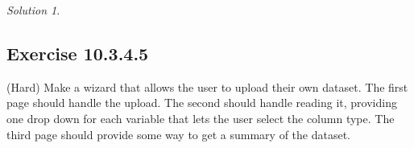 \documentclass[
]{book}
\newenvironment{Shaded}{\begin{snugshade}}{\end{snugshade}}
\newcommand{\AttributeTok}[1]{\textcolor[rgb]{0.77,0.63,0.00}{#1}}
\newcommand{\DecValTok}[1]{\textcolor[rgb]{0.00,0.00,0.81}{#1}}
\newcommand{\FunctionTok}[1]{\textcolor[rgb]{0.00,0.00,0.00}{#1}}
\newcommand{\NormalTok}[1]{#1}
\newcommand{\OtherTok}[1]{\textcolor[rgb]{0.56,0.35,0.01}{#1}}
\newcommand{\SpecialCharTok}[1]{\textcolor[rgb]{0.00,0.00,0.00}{#1}}
\newcommand{\StringTok}[1]{\textcolor[rgb]{0.31,0.60,0.02}{#1}}
\theoremstyle{definition}
\theoremstyle{definition}
\theoremstyle{definition}
\theoremstyle{definition}
\theoremstyle{remark}
\newtheorem*{solution}{Solution}
\begin{document}
\begin{solution}
\begin{Shaded}
\end{Shaded}

\end{solution}

\hypertarget{exercise-10.3.4.5}{%
\subsection*{Exercise 10.3.4.5}\label{exercise-10.3.4.5}}

(Hard) Make a wizard that allows the user to upload their own dataset. The first page should handle the upload. The second should handle reading it, providing one drop down for each variable that lets the user select the column type. The third page should provide some way to get a summary of the dataset.
\end{document}
